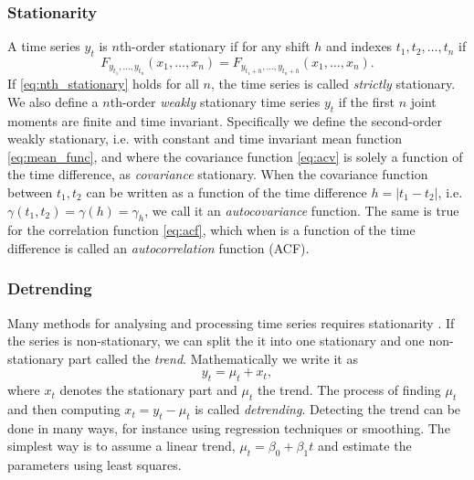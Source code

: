 \documentclass{article}
\theoremstyle{plain}
\theoremstyle{definition}
\theoremstyle{remark}
\begin{document}
\subsubsection{Stationarity}
A time series $y_t$ is $n$th-order stationary if for any shift $h$ and indexes $t_1, t_2, \hdots, t_n$ if 
\begin{equation}\label{eq:nth_stationary}
        F_{y_{t_1}, \hdots, y_{t_n}}(x_1, \hdots, x_n) = F_{y_{t_{1}+h}, \hdots, y_{t_{n} +h}} (x_1, \hdots, x_n).
\end{equation}
If \eqref{eq:nth_stationary} holds for all $n$, the time series is called \textit{strictly} stationary.
We also define a $n$th-order \textit{weakly} stationary time series $y_t$ if the first $n$ joint moments are finite and time invariant.
Specifically we define the second-order weakly stationary, i.e. with constant and time invariant mean function \eqref{eq:mean_func}, and where the covariance function \eqref{eq:acv} is solely a function of the time difference, as \textit{covariance} stationary.
When the covariance function between $t_1, t_2$ can be written as a function of the time difference $h = |t_1 - t_2|$, i.e. $\gamma (t_1, t_2) = \gamma (h) = \gamma_h$, we call it an \textit{autocovariance} function. 
The same is true for the correlation function \eqref{eq:acf}, which when is a function of the time difference is called an \textit{autocorrelation} function (ACF).








\subsubsection{Detrending}
Many methods for analysing and processing time series requires stationarity \cite{shumway}.
If the series is non-stationary, we can split the it into one stationary and one non-stationary part called the \textit{trend}.
Mathematically we write it as 
\begin{equation*}
        y_t = \mu_t + x_t,
\end{equation*}
where $x_t$ denotes the stationary part and $\mu_t$ the trend.
The process of finding $\mu_t$ and then computing $x_t = y_t - \mu_t$ is called \textit{detrending}.
Detecting the trend can be done in many ways, for instance using regression techniques or smoothing.
The simplest way is to assume a linear trend, $\mu_t = \beta_0 + \beta_1 t$ and estimate the parameters using least squares.
\end{document}

